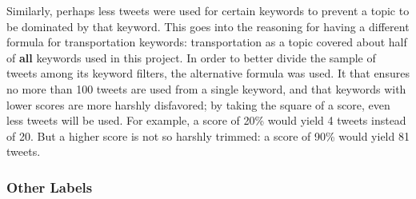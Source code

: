 \documentclass[12pt, a4paper]{article}
\begin{document}
    Similarly, perhaps less tweets were used for certain keywords to prevent a topic to be dominated by that keyword. This goes into the reasoning for having a different formula for transportation keywords: transportation as a topic covered about half of \textbf{all} keywords used in this project. In order to better divide the sample of tweets among its keyword filters, the alternative formula was used. It that ensures no more than 100 tweets are used from a single keyword, and that keywords with lower scores are more harshly disfavored; by taking the square of a score, even less tweets will be used. For example, a score of 20\% would yield 4 tweets instead of 20. But a higher score is not so harshly trimmed: a score of 90\% would yield 81 tweets.
    
\subsubsection{Other Labels}
\end{document}
